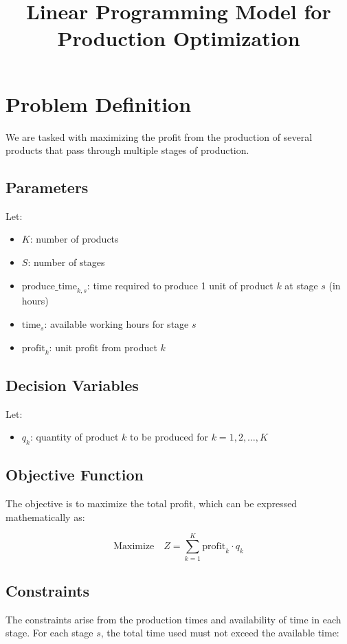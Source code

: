 \documentclass{article}
\begin{document}
\title{Linear Programming Model for Production Optimization}
\author{}
\date{}
\maketitle

\section*{Problem Definition}
We are tasked with maximizing the profit from the production of several products that pass through multiple stages of production. 

\subsection*{Parameters}
Let:
\begin{itemize}
    \item \( K \): number of products
    \item \( S \): number of stages
    \item \( \text{produce\_time}_{k,s} \): time required to produce 1 unit of product \( k \) at stage \( s \) (in hours)
    \item \( \text{time}_{s} \): available working hours for stage \( s \) 
    \item \( \text{profit}_{k} \): unit profit from product \( k \)
\end{itemize}

\subsection*{Decision Variables}
Let:
\begin{itemize}
    \item \( q_{k} \): quantity of product \( k \) to be produced for \( k = 1, 2, \ldots, K \)
\end{itemize}

\subsection*{Objective Function}
The objective is to maximize the total profit, which can be expressed mathematically as:

\[
\text{Maximize} \quad Z = \sum_{k=1}^{K} \text{profit}_{k} \cdot q_{k}
\]

\subsection*{Constraints}
The constraints arise from the production times and availability of time in each stage. For each stage \( s \), the total time used must not exceed the available time:
\end{document}
